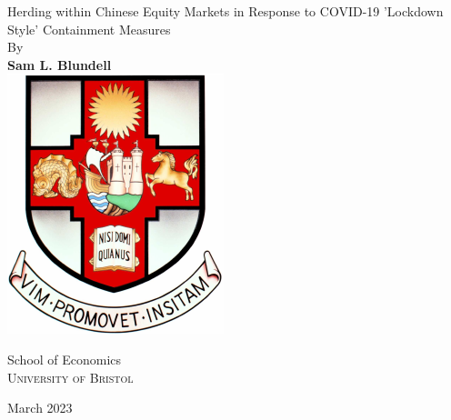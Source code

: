 \begin{titlepage}
    \begin{center}
        \vspace*{1cm}
        {\huge
        Herding within Chinese Equity Markets in Response to COVID-19
’Lockdown Style’ Containment Measures}
        \vspace{0.5cm}
        \\
        {\large By}
        \\
        \vspace{0.5cm}
        \textbf{Sam L. Blundell}
   		\vspace{1.5cm}
        \\
        \vspace{1.5cm}
       \includegraphics[scale=1]{TeX_files/bristolcrest_colour.pdf}
    
        \vspace{10mm}
        \large{School of Economics}
        \\
        \textsc{University of Bristol}

        \vspace{0.8cm}

        \large{March 2023}
        
    \end{center}
    
 

\end{titlepage}